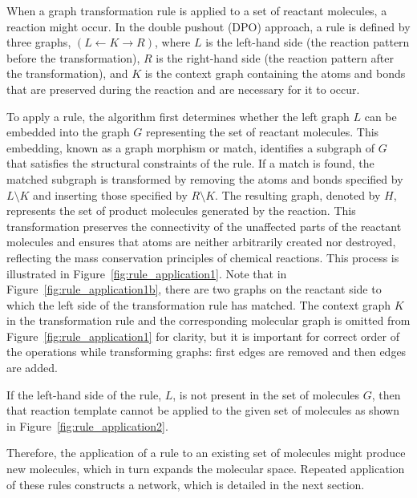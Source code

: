 When a graph transformation rule is applied to a set of reactant molecules, a reaction might occur. In the double pushout (DPO) approach, a rule is defined by three graphs, $(L \xleftarrow{} K \xrightarrow{} R)$, where $L$ is the left-hand side (the reaction pattern before the transformation), $R$ is the right-hand side (the reaction pattern after the transformation), and $K$ is the context graph containing the atoms and bonds that are preserved during the reaction and are necessary for it to occur.

To apply a rule, the algorithm first determines whether the left graph $L$ can be embedded into the graph $G$ representing the set of reactant molecules. This embedding, known as a graph morphism or match, identifies a subgraph of $G$ that satisfies the structural constraints of the rule. If a match is found, the matched subgraph is transformed by removing the atoms and bonds specified by $L \setminus K$ and inserting those specified by $R \setminus K$. The resulting graph, denoted by $H$, represents the set of product molecules generated by the reaction. This transformation preserves the connectivity of the unaffected parts of the reactant molecules and ensures that atoms are neither arbitrarily created nor destroyed, reflecting the mass conservation principles of chemical reactions. This process is illustrated in Figure~\ref{fig:rule_application1}. Note that in Figure~\ref{fig:rule_application1b}, there are two graphs on the reactant side to which the left side of the transformation rule has matched. The context graph $K$ in the transformation rule and the corresponding molecular graph is omitted from Figure~\ref{fig:rule_application1} for clarity, but it is important for correct order of the operations while transforming graphs: first edges are removed and then edges are added.

If the left-hand side of the rule, $L$, is not present in the set of molecules $G$, then that reaction template cannot be applied to the given set of molecules as shown in Figure~\ref{fig:rule_application2}.

Therefore, the application of a rule to an existing set of molecules might produce new molecules, which in turn expands the molecular space. Repeated application of these rules constructs a network, which is detailed in the next section.

